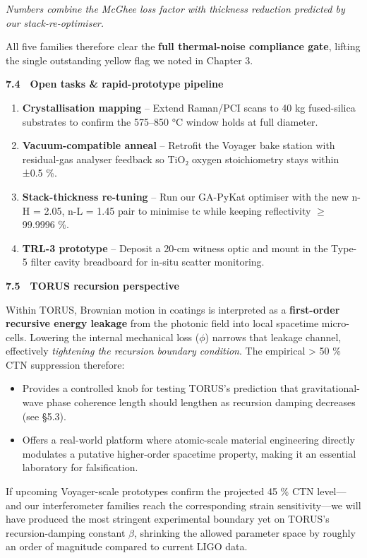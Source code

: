\documentclass[]{article}
\begin{document}
\emph{Numbers combine the McGhee loss factor with thickness reduction
predicted by our stack-re-optimiser.}

All five families therefore clear the \textbf{full thermal-noise
compliance gate}, lifting the single outstanding yellow flag we noted in
Chapter 3.

\textbf{7.4 Open tasks \& rapid-prototype pipeline}

\begin{enumerate}
\def\labelenumi{\arabic{enumi}.}
\item
  \textbf{Crystallisation mapping} -- Extend Raman/PCI scans to 40 kg
  fused-silica substrates to confirm the 575--850 °C window holds at
  full diameter.
\item
  \textbf{Vacuum-compatible anneal} -- Retrofit the Voyager bake station
  with residual-gas analyser feedback so TiO₂ oxygen stoichiometry stays
  within ±0.5 \%.
\item
  \textbf{Stack-thickness re-tuning} -- Run our GA-PyKat optimiser with
  the new n-H = 2.05, n-L = 1.45 pair to minimise tc while keeping
  reflectivity $\geq$ 99.9996 \%.
\item
  \textbf{TRL-3 prototype} -- Deposit a 20-cm witness optic and mount in
  the Type-5 filter cavity breadboard for in-situ scatter monitoring.
\end{enumerate}

\textbf{7.5 TORUS recursion perspective}

Within TORUS, Brownian motion in coatings is interpreted as a
\textbf{first-order recursive energy leakage} from the photonic field
into local spacetime micro-cells. Lowering the internal mechanical loss
($\phi$) narrows that leakage channel, effectively \emph{tightening the
recursion boundary condition}. The empirical \textgreater{} 50 \% CTN
suppression therefore:

\begin{itemize}
\item
  Provides a controlled knob for testing TORUS's prediction that
  gravitational-wave phase coherence length should lengthen as recursion
  damping decreases (see §5.3).
\item
  Offers a real-world platform where atomic-scale material engineering
  directly modulates a putative higher-order spacetime property, making
  it an essential laboratory for falsification.
\end{itemize}

If upcoming Voyager-scale prototypes confirm the projected 45 \% CTN
level---and our interferometer families reach the corresponding strain
sensitivity---we will have produced the most stringent experimental
boundary yet on TORUS's recursion-damping constant $\beta$, shrinking the
allowed parameter space by roughly an order of magnitude compared to
current LIGO data.
\end{document}
